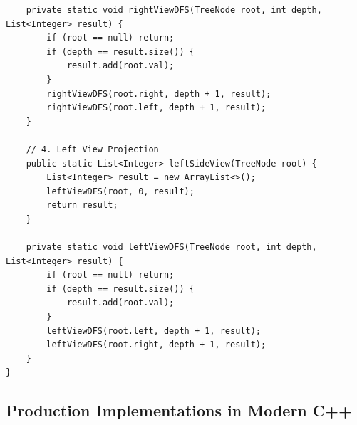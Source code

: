 \documentclass[10pt,journal,compsoc,onecolumn]{IEEEtran}
\begin{document}
\begin{verbatim}
    private static void rightViewDFS(TreeNode root, int depth, List<Integer> result) {
        if (root == null) return;
        if (depth == result.size()) {
            result.add(root.val);
        }
        rightViewDFS(root.right, depth + 1, result);
        rightViewDFS(root.left, depth + 1, result);
    }

    // 4. Left View Projection
    public static List<Integer> leftSideView(TreeNode root) {
        List<Integer> result = new ArrayList<>();
        leftViewDFS(root, 0, result);
        return result;
    }

    private static void leftViewDFS(TreeNode root, int depth, List<Integer> result) {
        if (root == null) return;
        if (depth == result.size()) {
            result.add(root.val);
        }
        leftViewDFS(root.left, depth + 1, result);
        leftViewDFS(root.right, depth + 1, result);
    }
}
\end{verbatim}

\subsection{Production Implementations in Modern C++}
\end{document}
